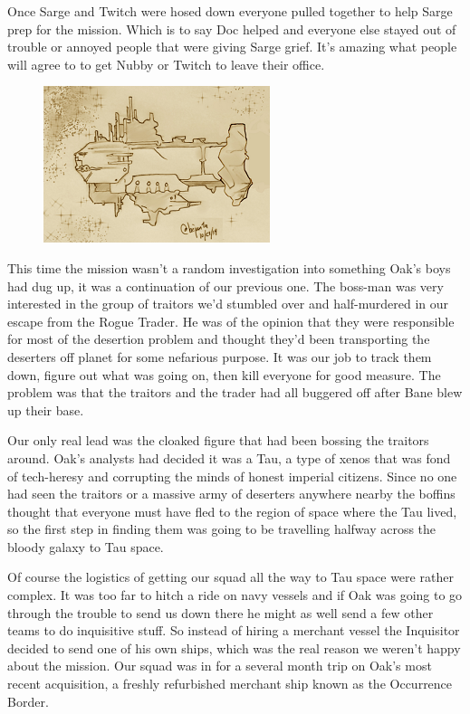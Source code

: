 Once Sarge and Twitch were hosed down everyone pulled together to help Sarge prep for the mission. 
Which is to say Doc helped and everyone else stayed out of trouble or annoyed people that were giving Sarge grief. 
It's amazing what people will agree to to get Nubby or Twitch to leave their office.

\begin{figure}
	\begin{center}
		\includegraphics[width=\figwidth]{pics/10/3.png}
	\end{center}
\end{figure}
This time the mission wasn't a random investigation into something Oak's boys had dug up, it was a continuation of our previous one. 
The boss-man was very interested in the group of traitors we'd stumbled over and half-murdered in our escape from the Rogue Trader. 
He was of the opinion that they were responsible for most of the desertion problem and thought they'd been transporting the deserters off planet for some nefarious purpose. 
It was our job to track them down, figure out what was going on, then kill everyone for good measure. 
The problem was that the traitors and the trader had all buggered off after Bane blew up their base.

Our only real lead was the cloaked figure that had been bossing the traitors around. 
Oak's analysts had decided it was a Tau, a type of xenos that was fond of tech-heresy and corrupting the minds of honest imperial citizens. 
Since no one had seen the traitors or a massive army of deserters anywhere nearby the boffins thought that everyone must have fled to the region of space where the Tau lived, so the first step in finding them was going to be travelling halfway across the bloody galaxy to Tau space.

Of course the logistics of getting our squad all the way to Tau space were rather complex. 
It was too far to hitch a ride on navy vessels and if Oak was going to go through the trouble to send us down there he might as well send a few other teams to do inquisitive stuff. 
So instead of hiring a merchant vessel the Inquisitor decided to send one of his own ships, which was the real reason we weren't happy about the mission. 
Our squad was in for a several month trip on Oak's most recent acquisition, a freshly refurbished merchant ship known as the Occurrence Border.

